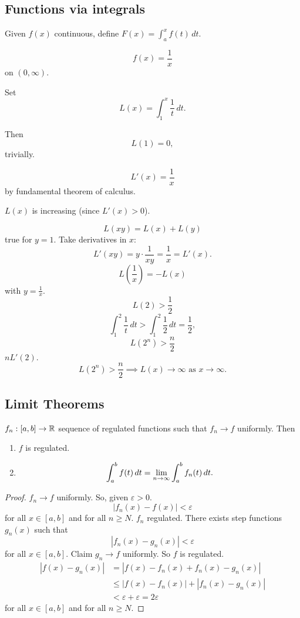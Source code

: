 \documentclass[10pt, a4paper]{article}
\begin{document}
\subsection{Functions via integrals}
Given $f(x)$ continuous,
define $F(x) = \int_{a}^{x}f(t)\,dt$.

\begin{example}
    \[
    f(x) = \frac{1}{x}
    \]
    on $(0, \infty)$.

    Set
    \[
    L(x) = \int_{1}^{x}\frac{1}{t}\,dt.
    \]

    Then
    \[
    L(1) = 0,
    \]
    trivially.
    
    \[
    L'(x) = \frac{1}{x}
    \]
    by fundamental theorem of calculus.

    $L(x)$ is increasing
    (since $L'(x) > 0$).

    \[
    L(xy) = L(x) + L(y)
    \]
    true for $y = 1$.
    Take derivatives in $x$:
    \[
    L'(xy) = y \cdot \frac{1}{xy} = \frac{1}{x} = L'(x).
    \]
    \[
    L\left(\frac{1}{x}\right) = -L(x)
    \]
    with $y = \frac{1}{x}$.
    \[
    L(2) > \frac{1}{2}
    \]
    \[
    \int_{1}^{2}\frac{1}{t}\,dt > \int_{1}^{2}\frac{1}{2}\,dt = \frac{1}{2},
    \]
    \[
    L(2 ^ n) > \frac{n}{2}
    \]
    $nL'(2)$.
    \[
    L(2 ^ n) > \frac{n}{2} \implies L(x) \to \infty \text{ as } x \to \infty.
    \]
\end{example}

\subsection{Limit Theorems}

\begin{theorem}
    $f_n : [a, b] \to \mathbb{R}$ sequence of regulated functions such that $f_n \to f$ uniformly.
    Then
    \begin{enumerate}[label = (\roman*)]
        \item $f$ is regulated.
        
        \item
        \[
        \int_{a}^{b}f(t)\,dt = \lim_{n \rightarrow \infty}\int_{a}^{b}f_n(t)\,dt.
        \]
    \end{enumerate}

    \begin{proof}
        $f_n \to f$ uniformly.
        So,
        given $\varepsilon > 0$.
        \[
        |f_n(x) - f(x)| < \varepsilon
        \]
        for all $x \in [a, b]$ and for all $n \geq N$.
        $f_n$ regulated.
        There exists step functions $g_n(x)$ such that
        \[
        |f_n(x) - g_n(x)| < \varepsilon
        \]
        for all $x \in [a, b]$.
        Claim $g_n \to f$ uniformly.
        So $f$ is regulated.
        \begin{align*}
            |f(x) - g_n(x)| &= |f(x) - f_n(x) + f_n(x) - g_n(x)| \\
            &\leq |f(x) - f_n(x)| + |f_n(x) - g_n(x)| \\
            &< \varepsilon + \varepsilon = 2\varepsilon
        \end{align*}
        for all $x \in [a, b]$ and for all $n \geq N$.
    \end{proof}
\end{theorem}
\end{document}
